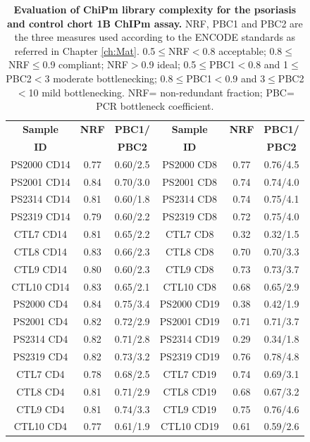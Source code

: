 \begin{table}[htbp]
\renewcommand{\arraystretch}{0.7}
\centering
\begin{tabular}{@{} c c c|c c c}
\toprule
\textbf{Sample} & \textbf{NRF} & \textbf{PBC1/} & \textbf{Sample} & \textbf{NRF} & \textbf{PBC1/} \\
\textbf{ID}        &              & \textbf{PBC2}  & \textbf{ID}        &              & \textbf{PBC2} \\
\midrule
\midrule
PS2000 CD14	& 0.77	& 0.60/2.5 & PS2000 CD8 & 0.77 &	0.76/4.5\\
PS2001 CD14	& 0.84	& 0.70/3.0 & PS2001 CD8 & 0.74 &	0.74/4.0\\
PS2314 CD14	& 0.81	& 0.60/1.8 & PS2314 CD8 & 0.74 &	0.75/4.1\\
PS2319 CD14	& 0.79	& 0.60/2.2 & PS2319 CD8 & 0.72 &	0.75/4.0\\
CTL7 CD14	  & 0.81	& 0.65/2.2 & CTL7 CD8	 & 0.32 & 0.32/1.5\\
CTL8 CD14	  & 0.83	& 0.66/2.3 & CTL8 CD8	 & 0.70 &	0.70/3.3\\
CTL9 CD14	  & 0.80	& 0.60/2.3 & CTL9 CD8	 & 0.73 &	0.73/3.7\\
CTL10 CD14	& 0.83	& 0.65/2.1 & CTL10 CD8 & 0.68 &	0.65/2.9\\
\midrule
PS2000 CD4  & 0.84	& 0.75/3.4 & PS2000 CD19	& 0.38 & 0.42/1.9\\
PS2001 CD4	& 0.82	& 0.72/2.9 & PS2001 CD19	& 0.71 & 0.71/3.7\\
PS2314 CD4	& 0.82	& 0.71/2.8 & PS2314 CD19	& 0.29 & 0.34/1.8\\
PS2319 CD4	& 0.82	& 0.73/3.2 & PS2319 CD19	& 0.76 & 0.78/4.8\\
CTL7 CD4	  & 0.78	& 0.68/2.5 & CTL7	CD19    & 0.74	& 0.69/3.1\\
CTL8 CD4    & 0.81	& 0.71/2.9 & CTL8	CD19    & 0.68  &	0.67/3.2\\
CTL9 CD4    & 0.81	& 0.74/3.3 & CTL9	CD19    & 0.75  &	0.76/4.6\\
CTL10 CD4   & 0.77	& 0.61/1.9 & CTL10	CD19  & 0.61  & 0.59/2.6\\
\bottomrule
\end{tabular}
\medskip %
\caption[Evaluation of ChiPm library complexity for the psoriasis and control chort 1B ChIPm assay.]{\textbf{Evaluation of ChiPm library complexity for the psoriasis and control chort 1B ChIPm assay.} NRF, PBC1 and PBC2 are the three measures used according to the ENCODE standards as referred in Chapter \ref{ch:Mat}. 0.5$\leq$NRF$<$0.8 acceptable; 0.8$\leq$NRF$\leq$0.9 compliant; NRF$>$0.9 ideal; 0.5$\leq$PBC1$<$0.8 and 1$\leq$PBC2$<$3 moderate bottlenecking; 0.8$\leq$PBC1$<$0.9 and 3$\leq$PBC2$<$10 mild bottlenecking. NRF= non-redundant fraction; PBC= PCR bottleneck coefficient.}
\label{tab:ChIPm_PS_CTL_library_complexity}
\end{table}
\bigskip %




